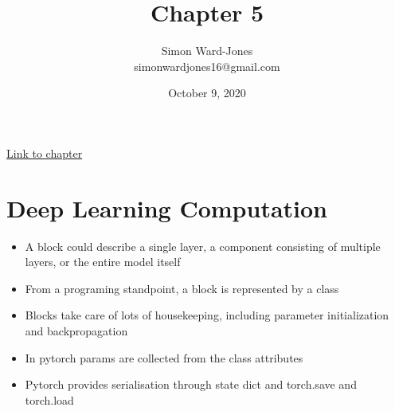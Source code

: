 \documentclass[12pt,notitlepage]{article}
\begin{document}


\title{\Large{\textbf{Chapter 5}}}
\date{October 9, 2020}
\author{Simon Ward-Jones\\simonwardjones16@gmail.com}

\maketitle
\href{https://d2l.ai/chapter_deep-learning-computation/index.html}{Link to chapter}

\section{Deep Learning Computation}
\begin{itemize}
    \item A block could describe a single layer, a component consisting of multiple layers, or the entire model itself
    \item From a programing standpoint, a block is represented by a class
    \item Blocks take care of lots of housekeeping, including parameter initialization and backpropagation
    \item In pytorch params are collected from the class attributes
    \item Pytorch provides serialisation through state dict and torch.save and torch.load
\end{itemize}

\vfill

\nocite{zhang2020dive}
\end{document}
